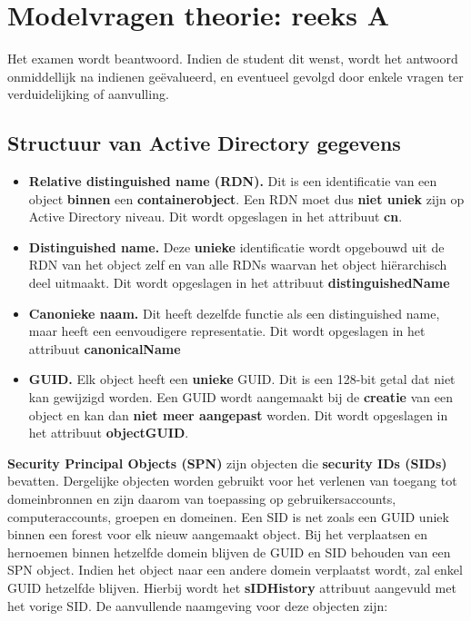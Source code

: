 \chapter{Modelvragen theorie: reeks A}
	Het examen wordt  beantwoord. Indien de student dit wenst, wordt het antwoord onmiddellijk na indienen geëvalueerd, en eventueel gevolgd door enkele vragen ter verduidelijking of aanvulling.
	
	
	\section{Structuur van Active Directory gegevens}
	\begin{enumerate}
		{ 
			\begin{itemize}
				\item \textbf{Relative distinguished name (RDN).} Dit is een identificatie van een object \textbf{binnen} een \textbf{containerobject}. Een RDN moet dus \textbf{niet uniek} zijn op Active Directory niveau. Dit wordt opgeslagen in het attribuut \textbf{cn}.
				
				\item \textbf{Distinguished name.} Deze \textbf{unieke} identificatie wordt opgebouwd uit de RDN van het object zelf en van alle RDNs waarvan het object hiërarchisch deel uitmaakt. Dit wordt opgeslagen in het attribuut \textbf{distinguishedName}
				
				\item \textbf{Canonieke naam.} Dit heeft dezelfde functie als een distinguished name, maar heeft een eenvoudigere representatie. Dit wordt opgeslagen in het attribuut \textbf{canonicalName}
				
				\item \textbf{GUID.} Elk object heeft een \textbf{unieke} GUID. Dit is een 128-bit getal dat niet kan gewijzigd worden. Een GUID wordt aangemaakt bij de \textbf{creatie} van een object en kan dan \textbf{niet meer aangepast} worden. Dit wordt opgeslagen in het attribuut \textbf{objectGUID}.
			\end{itemize}
			
		}	
		 { 
			\textbf{Security Principal Objects (SPN)} zijn objecten die \textbf{security IDs (SIDs)} bevatten. Dergelijke objecten worden gebruikt voor het verlenen van toegang tot domeinbronnen en zijn daarom van toepassing op gebruikersaccounts, computeraccounts, groepen en domeinen. Een SID is net zoals een GUID uniek binnen een forest voor elk nieuw aangemaakt object. Bij het verplaatsen en hernoemen binnen hetzelfde domein blijven de GUID en SID behouden van een SPN object. Indien het object naar een andere domein verplaatst wordt, zal enkel GUID hetzelfde blijven. Hierbij wordt het \textbf{sIDHistory} attribuut aangevuld met het vorige SID.	De aanvullende naamgeving voor deze objecten zijn:

}
\end{enumerate}
